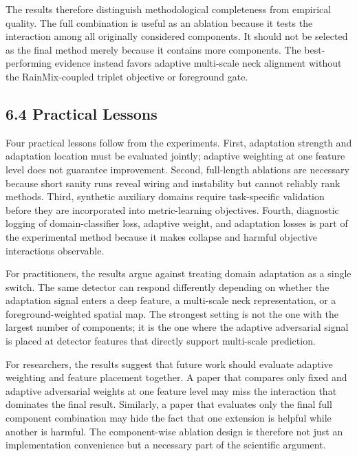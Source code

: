 \documentclass[
  11pt,
]{article}
\begin{document}
The results therefore distinguish methodological completeness from
empirical quality. The full combination is useful as an ablation because
it tests the interaction among all originally considered components. It
should not be selected as the final method merely because it contains
more components. The best-performing evidence instead favors adaptive
multi-scale neck alignment without the RainMix-coupled triplet objective
or foreground gate.

\hypertarget{practical-lessons}{%
\subsection{6.4 Practical Lessons}\label{practical-lessons}}

Four practical lessons follow from the experiments. First, adaptation
strength and adaptation location must be evaluated jointly; adaptive
weighting at one feature level does not guarantee improvement. Second,
full-length ablations are necessary because short sanity runs reveal
wiring and instability but cannot reliably rank methods. Third,
synthetic auxiliary domains require task-specific validation before they
are incorporated into metric-learning objectives. Fourth, diagnostic
logging of domain-classifier loss, adaptive weight, and adaptation
losses is part of the experimental method because it makes collapse and
harmful objective interactions observable.

For practitioners, the results argue against treating domain adaptation
as a single switch. The same detector can respond differently depending
on whether the adaptation signal enters a deep feature, a multi-scale
neck representation, or a foreground-weighted spatial map. The strongest
setting is not the one with the largest number of components; it is the
one where the adaptive adversarial signal is placed at detector features
that directly support multi-scale prediction.

For researchers, the results suggest that future work should evaluate
adaptive weighting and feature placement together. A paper that compares
only fixed and adaptive adversarial weights at one feature level may
miss the interaction that dominates the final result. Similarly, a paper
that evaluates only the final full component combination may hide the
fact that one extension is helpful while another is harmful. The
component-wise ablation design is therefore not just an implementation
convenience but a necessary part of the scientific argument.
\end{document}
